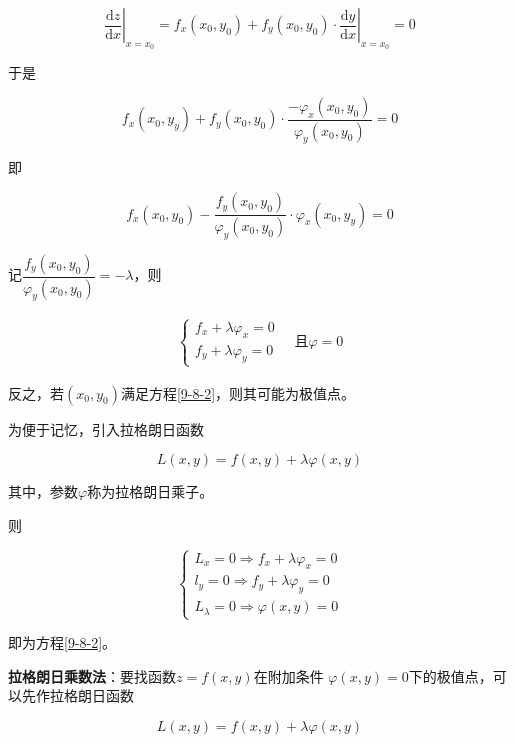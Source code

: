 \documentclass[12pt, a4paper]{article}
\numberwithin{equation}{section}
\newcommand{\rmd}{\mathrm{d}}
\begin{document}
    $$
        \left.\frac{\rmd z}{\rmd x}\right|_{x=x_0}=
        f_x\left(x_0, y_0\right)+\left.f_y\left(x_0, y_0\right) \cdot \frac{\rmd y}{\rmd x}\right|_{x=x_0}=0
    $$

    于是

    $$
        f_x\left(x_0, y_y\right)+f_y\left(x_0, y_0\right) \cdot
        \frac{-\varphi_x\left(x_0, y_0\right)}{\varphi_y\left(x_0, y_0\right)}=0
    $$

    即

    $$
        f_x\left(x_0, y_0\right)-\frac{f_y\left(x_0, y_0\right)}{\varphi_y\left(x_0, y_0\right)}
        \cdot \varphi_x\left(x_0, y_y\right)=0
    $$

    记$\dfrac{f_y\left(x_0, y_0\right)}{\varphi_y\left(x_0, y_0\right)}=-\lambda$，则

    \begin{align}
        \left\{\begin{array}{l}
            f_x+\lambda \varphi_x=0 \\
            f_y+\lambda \varphi_y=0
        \end{array} \quad \text{且} \varphi=0\right.
        \label{9-8-2}
    \end{align}
    
    反之，若\(\left(x_0,y_0\right)\)满足方程\ref{9-8-2}，则其可能为极值点。

    为便于记忆，引入拉格朗日函数

    \begin{equation*}
        L(x, y)=f(x, y)+\lambda \varphi(x, y)
    \end{equation*}

    其中，参数\(\varphi\)称为拉格朗日乘子。

    则

    $$
        \left\{\begin{array}{l}
        L_x=0 \Rightarrow f_x+\lambda \varphi_x=0 \\
        l_y=0 \Rightarrow f_y+\lambda \varphi_y=0 \\
        L_\lambda=0 \Rightarrow \varphi(x, y)=0
        \end{array}\right.
    $$

    即为方程\ref{9-8-2}。
    \vspace{1em}

    \textbf{拉格朗日乘数法}：要找函数\(z=f\left(x,y\right)\)在附加条件
    \(\varphi\left(x,y \right)=0\)下的极值点，可以先作拉格朗日函数

    \begin{equation}
        L(x, y)=f(x, y)+\lambda \varphi(x, y)
    \end{equation}
\end{document}
